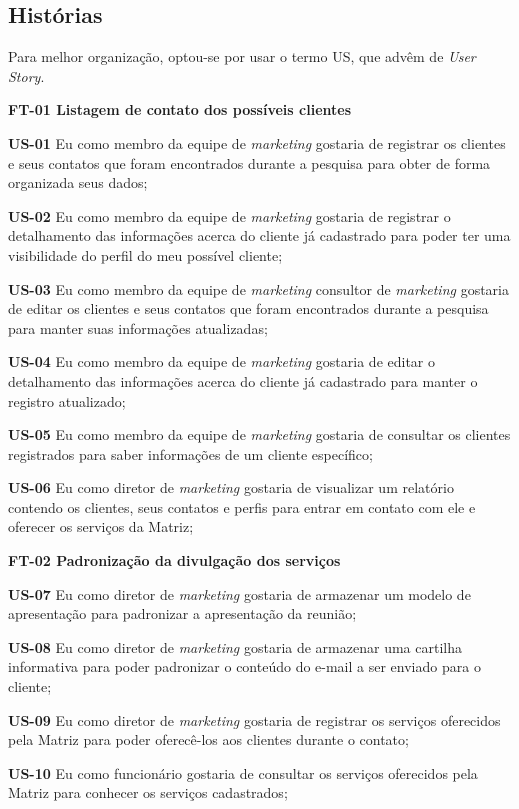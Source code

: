 \subsection{Histórias}
Para melhor organização, optou-se por usar o termo US, que advêm de \textit{User Story}.

\textbf{FT-01 Listagem de contato dos possíveis clientes}

\textbf{US-01} Eu como membro da equipe de \textit{marketing} gostaria de registrar os clientes e seus contatos que foram encontrados durante a pesquisa para obter de forma organizada seus dados;


\textbf{US-02} Eu como membro da equipe de \textit{marketing} gostaria de registrar o detalhamento das informações acerca do cliente já cadastrado para poder ter uma visibilidade do perfil do meu possível cliente;


\textbf{US-03} Eu como membro da equipe de \textit{marketing} consultor de \textit{marketing} gostaria de editar os clientes e seus contatos que foram encontrados durante a pesquisa para manter suas informações atualizadas;


\textbf{US-04} Eu como membro da equipe de \textit{marketing} gostaria de editar o detalhamento das informações acerca do cliente já cadastrado para manter o registro atualizado;


\textbf{US-05} Eu como membro da equipe de \textit{marketing} gostaria de consultar os clientes registrados para saber informações de um cliente específico;


\textbf{US-06} Eu como diretor de \textit{marketing} gostaria de visualizar um relatório contendo os clientes, seus contatos e perfis para entrar em contato com ele e oferecer os serviços da Matriz;

\textbf{FT-02 Padronização da divulgação dos serviços}

\textbf{US-07} Eu como diretor de \textit{marketing} gostaria de armazenar um modelo de apresentação para padronizar a apresentação da reunião;


\textbf{US-08} Eu como diretor de \textit{marketing} gostaria de armazenar uma cartilha informativa para poder padronizar o conteúdo do e-mail a ser enviado para o cliente;


\textbf{US-09} Eu como diretor de \textit{marketing} gostaria de registrar os serviços oferecidos pela Matriz para poder oferecê-los aos clientes durante o contato;


\textbf{US-10} Eu como funcionário gostaria de consultar os serviços oferecidos pela Matriz para conhecer os serviços cadastrados;


